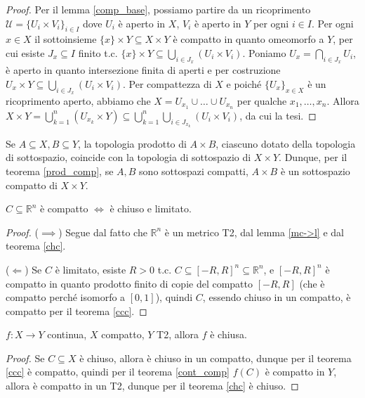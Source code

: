 \begin{proof}
  Per il lemma \ref{comp_base}, possiamo partire da un ricoprimento $\mathcal{U}=\{U_i \times V_i\}_{i \in I}$ dove $U_i$ è aperto in $X$, $V_i$ è aperto in $Y$ per ogni $i \in I$.
  Per ogni $x \in X$ il sottoinsieme $\{x\} \times Y \subseteq X \times Y$ è compatto in quanto omeomorfo a $Y$, per cui esiste $J_x \subseteq I$ finito t.c. $\displaystyle \{x\} \times Y \subseteq \bigcup_{i \in J_x} (U_i \times V_i)$. Poniamo $\displaystyle U_x= \bigcap_{i \in J_x} U_i$, è aperto in quanto intersezione finita di aperti e per costruzione
  $\displaystyle U_x \times Y \subseteq \bigcup_{i \in J_x} (U_i \times V_i)$. Per compattezza di $X$ e poiché $\{U_x\}_{x \in X}$ è un ricoprimento aperto, abbiamo che $X=U_{x_1} \cup \dots \cup U_{x_n}$ per qualche $x_1, \dots, x_n$.
  Allora $\displaystyle X \times Y=\bigcup_{k=1}^n (U_{x_k} \times Y) \subseteq \bigcup_{k=1}^n \bigcup_{i \in J_{x_k}} (U_i \times V_i)$, da cui la tesi.
\end{proof}

\begin{oss}
  Se $A \subseteq X, B \subseteq Y$, la topologia prodotto di $A \times B$, ciascuno dotato della topologia di sottospazio, coincide con la topologia di sottospazio di $X \times Y$. Dunque, per il teorema \ref{prod_comp}, se $A, B$ sono sottospazi compatti, $A \times B$ è un sottospazio compatto di $X \times Y$.
\end{oss}

\begin{prop}
  $C \subseteq \mathbb{R}^n$ è compatto $\Leftrightarrow$ è chiuso e limitato.
\end{prop}

\begin{proof}
  ($\implies$) Segue dal fatto che $\mathbb{R}^n$ è un metrico T2, dal lemma \ref{mc->l} e dal teorema \ref{chc}.

  ($\Leftarrow$) Se $C$ è limitato, esiste $R>0$ t.c. $C \subseteq [-R, R]^n \subseteq \mathbb{R}^n$, e $[-R, R]^n$ è compatto in quanto prodotto finito di copie del compatto $[-R, R]$ (che è compatto perché isomorfo a $[0, 1]$), quindi $C$, essendo chiuso in un compatto, è compatto per il teorema \ref{ccc}.
\end{proof}

\begin{thm}
  $f:X \rightarrow Y$ continua, $X$ compatto, $Y$ T2, allora $f$ è chiusa.
\end{thm}

\begin{proof}
  Se $C \subseteq X$ è chiuso, allora è chiuso in un compatto, dunque per il teorema \ref{ccc} è compatto, quindi per il teorema \ref{cont_comp} $f(C)$ è compatto in $Y$, allora è compatto in un T2, dunque per il teorema \ref{chc} è chiuso.
\end{proof}

